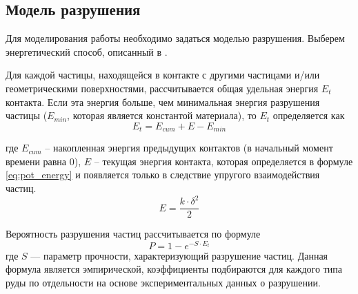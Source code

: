 \documentclass[utf8x, 14pt, oneside, a4paper]{article}
\begin{document}
\subsection{Модель разрушения}

Для моделирования работы необходимо задаться моделью разрушения.
Выберем энергетический способ, описанный в \cite{razr}.

Для каждой частицы, находящейся в контакте с другими частицами и/или геометрическими поверхностями, рассчитывается общая удельная энергия $E_t$ контакта.
Если эта энергия больше, чем минимальная энергия разрушения частицы ($E_{min}$, которая является константой материала), то $E_{t}$ определяется как
\begin{equation}
E_t = E_{cum} + E - E_{min}
\end{equation}

где $E_{cum}$ -- накопленная энергия предыдущих контактов (в начальный момент времени равна 0), $E$ -- текущая энергия контакта, которая определяется в формуле \ref{eq:pot_energy} и появляется только в следствие упругого взаимодействия частиц.
\begin{equation}
E = \frac{k \cdot \delta^2}{2}
\end{equation}

Вероятность разрушения частиц рассчитывается по формуле
\begin{equation}
P = 1 - e^{-S \cdot E_t} 
\end{equation}
где $S$ — параметр прочности, характеризующий разрушение частиц. Данная формула является эмпирической, коэффициенты подбираются для каждого типа руды по отдельности на основе экспериментальных данных о разрушении.
\end{document}
